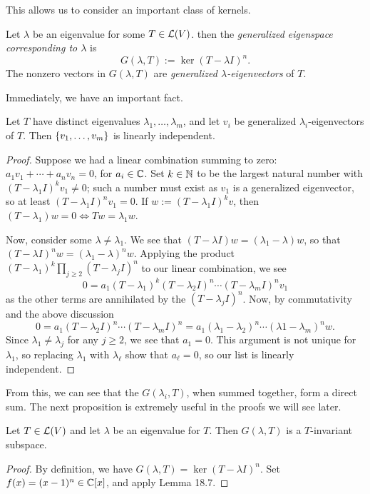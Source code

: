 \documentclass{article}
\begin{document}
This allows us to consider an important class of kernels.
\begin{definition}
Let $\lambda$ be an eigenvalue for some $T\in\mathcal L(V)$. then the \textit{generalized eigenspace corresponding to $\lambda$} is
$$G(\lambda, T) := \ker(T-\lambda I)^n.$$
The nonzero vectors in $G(\lambda, T)$ are \textit{generalized $\lambda$-eigenvectors} of $T$.
\end{definition}
\newpage
Immediately, we have an important fact.
\begin{theorem}
Let $T$ have distinct eigenvalues $\lambda_1, \ldots, \lambda_m$, and let $v_i$ be generalized $\lambda_i$-eigenvectors of $T$. Then $\left\{v_1, \ldots, v_m\right\}$ is linearly independent.
\end{theorem}
\begin{proof}
Suppose we had a linear combination summing to zero: $a_1v_1 + \cdots + a_nv_n = 0$, for $a_i\in\mathbb C$. Set $k\in\mathbb N$ to be the largest natural number with $(T - \lambda_1 I)^k v_1 \neq 0$; such a number must exist as $v_1$ is a generalized eigenvector, so at least $(T-\lambda_1I)^nv_1 = 0$. If $w := (T - \lambda_1I)^k v$, then $(T-\lambda_1)w = 0 \iff Tw = \lambda_1w$.

Now, consider some $\lambda\neq \lambda_1$. We see that $(T-\lambda I)w = (\lambda_1 - \lambda)w$, so that $(T-\lambda I)^nw = (\lambda_1-\lambda)^nw$. Applying the product $(T-\lambda_1)^k\prod_{j\geq 2} (T-\lambda_jI)^n$ to our linear combination, we see
$$0 = a_1(T-\lambda_1)^k(T-\lambda_2I)^n \cdots (T-\lambda_mI)^nv_1$$
as the other terms are annihilated by the $(T-\lambda_jI)^n$. Now, by commutativity and the above discussion
$$0 = a_1(T-\lambda_2I)^n\cdots (T-\lambda_mI)^n = a_1(\lambda_1-\lambda_2)^n \cdots (\lambda 1- \lambda_m)^n w.$$
Since $\lambda_1\neq \lambda_j$ for any $j\geq 2$, we see that $a_1=0$. This argument is not unique for $\lambda_1$, so replacing $\lambda_1$ with $\lambda_\ell$ show that $a_\ell =0$, so our list is linearly independent.
\end{proof}

From this, we can see that the $G(\lambda_i, T)$, when summed together, form a direct sum. The next proposition is extremely useful in the proofs we will see later.
\begin{proposition}
Let $T\in\mathcal L(V)$ and let $\lambda$ be an eigenvalue for $T$. Then $G(\lambda, T)$ is a $T$-invariant subspace.
\end{proposition}
\begin{proof}
By definition, we have $G(\lambda, T) = \ker (T-\lambda I)^n$. Set $f(x) = (x - 1)^n \in \mathbb C[x]$, and apply Lemma 18.7.
\end{proof}
\end{document}
